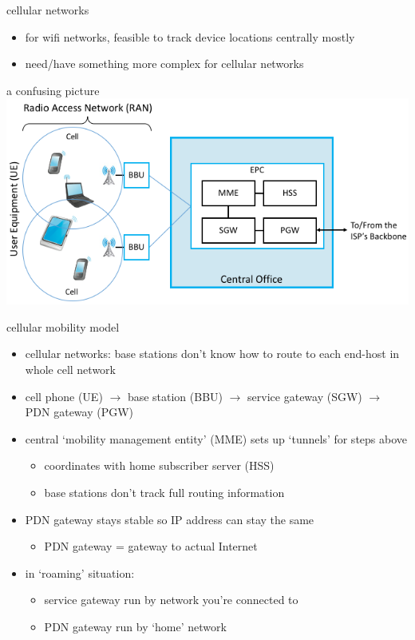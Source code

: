 \begin{frame}{cellular networks}
    \begin{itemize}
    \item for wifi networks, feasible to track device locations centrally mostly
    \vspace{.5cm}
    \item need/have something more complex for cellular networks
    \end{itemize}
\end{frame}

\begin{frame}{a confusing picture}
\includegraphics[width=\textwidth]{sysapp-fig53}
\end{frame}

\begin{frame}{cellular mobility model}
    \begin{itemize}
    \item cellular networks: base stations don't know how to route to each end-host in whole cell network
    \vspace{.5cm}
    \item cell phone (UE) $\rightarrow$ base station (BBU) $\rightarrow$ service gateway (SGW) $\rightarrow$ PDN gateway (PGW)
    \vspace{.5cm}
    \item central `mobility management entity' (MME) sets up `tunnels' for steps above
        \begin{itemize}
        \item coordinates with home subscriber server (HSS)
        \item base stations don't track full routing information
        \end{itemize}
    \item PDN gateway stays stable so IP address can stay the same
        \begin{itemize}
        \item PDN gateway = gateway to actual Internet
        \end{itemize}
    \item in `roaming' situation:
        \begin{itemize}
        \item service gateway run by network you're connected to
        \item PDN gateway run by `home' network
        \end{itemize}
    \end{itemize}
\end{frame}

